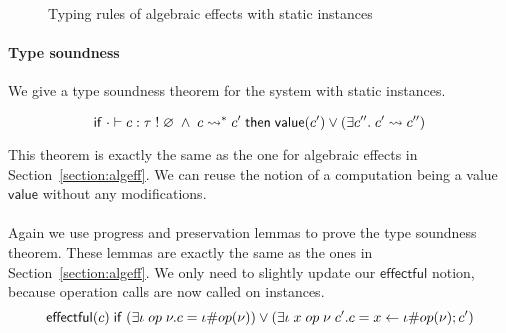 {\begin{figure}
\caption{Typing rules of algebraic effects with static instances}
\centering
{}
\end{figure}

\paragraph{Type soundness}
We give a type soundness theorem for the system with static instances.

\begin{theorem}
\[
	\mathsf{if}\;
		\cdot \vdash c : \tau \; ! \; \varnothing
		\;\land\;
		c \rightsquigarrow^* c'
	\;\mathsf{then}\;
		\mathsf{value}(c')
		\lor
		(\exists c''.\; c' \rightsquigarrow c'')
\]
\end{theorem}

This theorem is exactly the same as the one for algebraic effects in Section~\ref{section:algeff}.
We can reuse the notion of a computation being a value $\mathsf{value}$ without any modifications.
\\\\
Again we use progress and preservation lemmas to prove the type soundness theorem.
These lemmas are exactly the same as the ones in Section~\ref{section:algeff}.
We only need to slightly update our $\mathsf{effectful}$ notion, because operation calls are now called on instances.
\[ \mathsf{effectful}(c) \;\mathsf{if}\; (\exists \iota \; op \; \nu. c = \iota \# op(\nu)) \lor (\exists \iota \; x \; op \; \nu \; c'. c = x \leftarrow \iota \# op(\nu) ; c') \]

}
